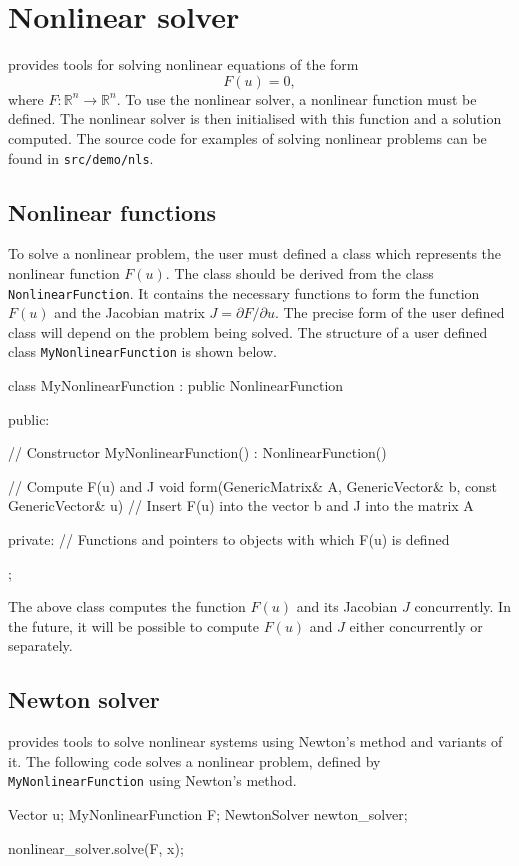 \chapter{Nonlinear solver}

\dolfin{} provides tools for solving nonlinear equations of the form
\begin{equation}
  F(u) = 0, 
\end{equation}
where $F: \mathbb{R}^{n} \rightarrow \mathbb{R}^{n}$. 
To use the nonlinear solver, a nonlinear function must be defined. 
The nonlinear solver is then initialised with this function and a 
solution computed. The source code for examples of solving 
nonlinear problems can be found in \texttt{src/demo/nls}.
\section{Nonlinear functions}

To solve a nonlinear problem, the user must defined a class which 
represents the nonlinear function $F(u)$. The class 
should be derived from the \dolfin{}  class \texttt{NonlinearFunction}. It
contains the necessary functions to form the function $F(u)$ and the 
Jacobian matrix  $J = \partial F / \partial u$. The precise form of the user 
defined class will depend on the problem being solved.
The structure of a user defined class \texttt{MyNonlinearFunction} is shown below.
%
\small
\begin{code}
class MyNonlinearFunction : public NonlinearFunction
{
public: 
  
 // Constructor 
 MyNonlinearFunction() : NonlinearFunction() {}
  
 // Compute F(u) and J 
 void form(GenericMatrix& A, GenericVector& b, 
           const GenericVector& u)
 {
   // Insert F(u) into the vector b and J into the matrix A 
 }

private:
 // Functions and pointers to objects with which F(u) is defined
};
\end{code}
\normalsize
%
The above class computes the function $F(u)$ and its Jacobian $J$
concurrently. In the future, it will be possible to compute 
$F(u)$ and $J$ either concurrently or separately.

\section{Newton solver}
%
\dolfin{} provides tools to solve nonlinear systems using Newton's method
and variants of it. The following code solves a nonlinear problem, defined by 
\texttt{MyNonlinearFunction} using Newton's method.
%
\begin{code}
Vector u;
MyNonlinearFunction F;
NewtonSolver newton_solver;

nonlinear_solver.solve(F, x);
\end{code}
%

